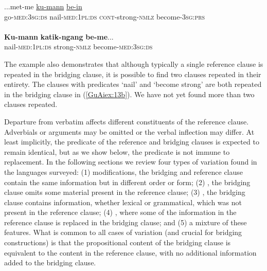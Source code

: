 \documentclass[output=paper]{LSP/langsci}
\begin{document}
\begin{exe}
\ex \label{GuAiex:13ab}
\begin{xlist}
\ex \label{GuAiex:13a}
\gll ...met-me     \underline{ku-mann}     \underline{}  \underline{be-in}\\
go-\textsc{med:3sg:ds}   nail-\textsc{med:1pl:ds}   \textsc{cont}-strong-\textsc{nmlz}   become-\textsc{3sg:prs}\\
\glt {} \\
\ex \label{GuAiex:13b}
\gll \textbf{Ku-mann}     \textbf{katik-ngang}    \textbf{be-me}... \\
nail-\textsc{med:1pl:ds}   strong-\textsc{nmlz}     become-\textsc{med:3sg:ds}\\
\glt {} 
\end{xlist}
\end{exe}

\noindent
The  example also demonstrates that although typically a single reference clause is repeated in the bridging clause, it is possible to find two clauses repeated in their entirety. The clauses with predicates `nail' and `become strong' are both repeated in the bridging clause in (\ref{GuAiex:13b}). We have not yet found more than two clauses repeated.

Departure from verbatim  affects different constituents of the reference clause. Adverbials or arguments may be omitted or the verbal inflection may differ. At least implicitly, the predicate of the reference and bridging clauses is expected to remain identical, but as we show below, the predicate is not immune to replacement. In the following sections we review four types of variation found in the languages surveyed: (1) modifications, the bridging and reference clause contain the same information but in different order or form; (2) , the bridging clause omits some material present in the reference clause; (3) , the bridging clause contains information, whether lexical or grammatical, which was not present in the reference clause; (4) , where some of the information in the reference clause is replaced in the bridging clause; and (5) a mixture of these features. What is common to all cases of variation (and crucial for bridging constructions) is that the propositional content of the bridging clause is equivalent to the content in the reference clause, with no additional information added to the bridging clause.
\end{document}
